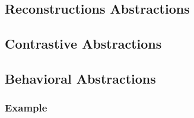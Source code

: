 

\subsection{Reconstructions Abstractions}
\subsection{Contrastive Abstractions}
\subsection{Behavioral Abstractions}
\subsubsection{Example}